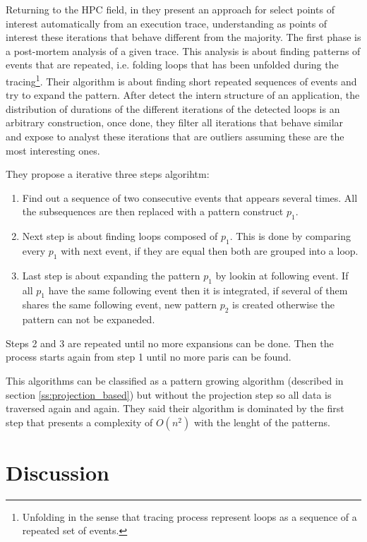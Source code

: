 Returning to the HPC field, in \cite{trahay2015selecting} they present an 
approach for select points of
interest automatically from an execution trace, understanding as points of 
interest these iterations that
behave different from the majority. The first phase is a post-mortem analysis of
a given trace. This analysis is about finding patterns of events that are
repeated, i.e. folding loops that has been unfolded during the
tracing\footnote{Unfolding in the sense that tracing process represent loops as
a sequence of a repeated set of events.}. Their algorithm is about finding short
repeated sequences of events and try to expand the pattern. After detect the
intern structure of an application, the distribution of durations of the
different iterations of the detected loops is an arbitrary construction, once
done, they filter all iterations that behave similar and
expose to analyst these iterations that are outliers assuming these are the
most interesting ones.

They propose a iterative three steps algorihtm:
\begin{enumerate}[label=\roman*)]
  \item Find out a sequence of two consecutive events that appears several
    times. All the subsequences are then replaced with a pattern construct
    $p_{1}$.
  \item Next step is about finding loops composed of $p_{1}$. This is done by
    comparing every $p_{1}$ with next event, if they are equal then both are
    grouped into a loop.
  \item Last step is about expanding the pattern $p_{1}$ by lookin at following
    event. If all $p_{1}$ have the same following event then it is integrated,
    if several of them shares the same following event, new pattern $p_{2}$ is
    created otherwise the pattern can not be expaneded.
\end{enumerate}
Steps 2 and 3 are repeated until no more expansions can be done. Then the
process starts again from step 1 until no more paris can be found.

This algorithms can be classified as a pattern growing algorithm (described in
section \ref{ss:projection_based}) but without the projection step so all data
is traversed again and again. They said their algorithm is dominated by the
first step that presents a complexity of $O(n^2)$ with the lenght of the
patterns.

\section{Discussion}

